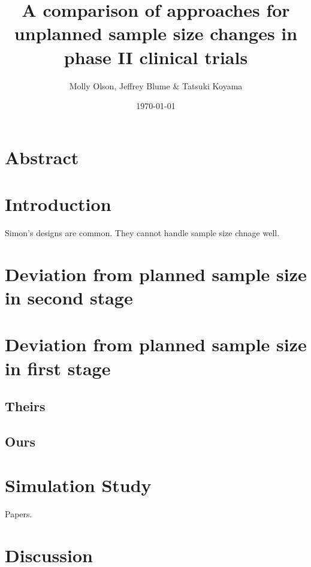 \documentclass{article}
\title{A comparison of approaches for unplanned sample size changes in phase {II} clinical trials}
\author{Molly Olson, Jeffrey Blume \& Tatsuki Koyama}
\date{\today}
\begin{document}
\maketitle
\thispagestyle{empty}
\newpage
\section*{Abstract}

\section{Introduction}
Simon's designs are common. They cannot handle sample size chnage well.

\section{Deviation from planned sample size in second stage}

\section{Deviation from planned sample size in first stage}

\subsection{Theirs}

\subsection{Ours}

\section{Simulation Study}
Papers. \cite{Porcher, Simon, Koyama}

\section{Discussion}



\end{document}
